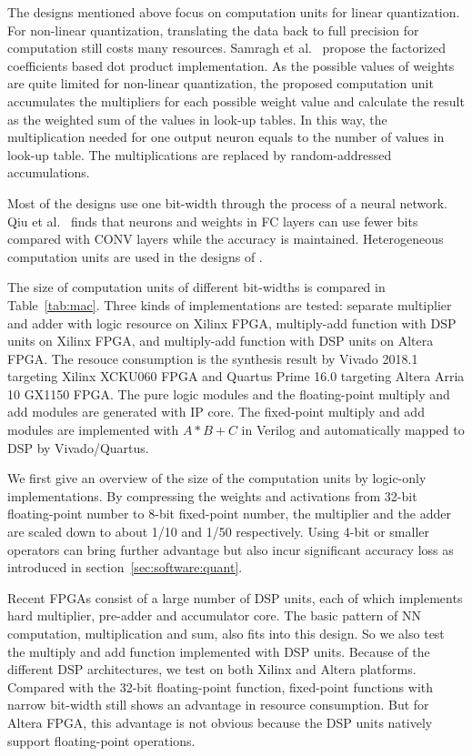 The designs mentioned above focus on computation units for linear quantization. For non-linear quantization, translating the data back to full precision for computation still costs many resources. Samragh et al.~\cite{samragh2017customizing} propose the factorized coefficients based dot product implementation. As the possible values of weights are quite limited for non-linear quantization, the proposed computation unit accumulates the multipliers for each possible weight value and calculate the result as the weighted sum of the values in look-up tables. In this way, the multiplication needed for one output neuron equals to the number of values in look-up table. The multiplications are replaced by random-addressed accumulations.

Most of the designs use one bit-width through the process of a neural network. Qiu et al.~\cite{qiu2016going} finds that neurons and weights in FC layers can use fewer bits compared with CONV layers while the accuracy is maintained. Heterogeneous computation units are used in the designs of \cite{zhao2017accelerating, guo2017bit}.

The size of computation units of different bit-widths is compared in Table~\ref{tab:mac}. Three kinds of implementations are tested: separate multiplier and adder with logic resource on Xilinx FPGA, multiply-add function with DSP units on Xilinx FPGA, and multiply-add function with DSP units on Altera FPGA. The resouce consumption is the synthesis result by Vivado 2018.1 targeting Xilinx XCKU060 FPGA and Quartus Prime 16.0 targeting Altera Arria 10 GX1150 FPGA. The pure logic modules and the floating-point multiply and add modules are generated with IP core. The fixed-point multiply and add modules are implemented with $A*B+C$ in Verilog and automatically mapped to DSP by Vivado/Quartus.

We first give an overview of the size of the computation units by logic-only implementations. By compressing the weights and activations from 32-bit floating-point number to 8-bit fixed-point number, the multiplier and the adder are scaled down to about 1/10 and 1/50 respectively. Using 4-bit or smaller operators can bring further advantage but also incur significant accuracy loss as introduced in section~\ref{sec:software:quant}. 

Recent FPGAs consist of a large number of DSP units, each of which implements hard multiplier, pre-adder and accumulator core. The basic pattern of NN computation, multiplication and sum, also fits into this design. So we also test the multiply and add function implemented with DSP units. Because of the different DSP architectures, we test on both Xilinx and Altera platforms. Compared with the 32-bit floating-point function, fixed-point functions with narrow bit-width still shows an advantage in resource consumption. But for Altera FPGA, this advantage is not obvious because the DSP units natively support floating-point operations. 

